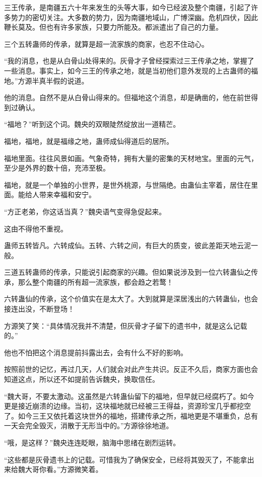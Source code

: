 \begin{this_body}
三王传承，是南疆五六十年来发生的头等大事，如今已经波及整个南疆，引起了许多势力的密切关注。大多数的势力，因为南疆地域山，广博深幽。危机四伏，因此鞭长莫及。但也有许多家族，只要力所能及。都派遣出了自己的力量。

三个五转蛊师的传承，就算是超一流家族的商家，也忍不住动心。

“我的消息，也是从白骨山处得来的。灰骨才子曾经探索过三王传承之地，掌握了一些消息。事实上，如今三王的传承之地，就是当初他们意外发现的上古蛊师的福地。”方源半真半假的说道。

他的消息。自然不是从白骨山得来的。但福地这个消息，却是确凿的，他在前世得到过确认。

“福地？”听到这个词。魏央的双眼陡然绽放出一道精芒。

福地，福地，就是福缘之地，蛊师成仙得道后的居所。

福地里面。往往风景如画。气象奇特，拥有大量的密集的天材地宝。里面的元气，至少是外界的数十倍，充沛至极。

福地，就是一个单独的小世界，是世外桃源，与世隔绝。由蛊仙主宰着，居住在里面。能给人带来幸福和安宁。

“方正老弟，你这话当真？”魏央语气变得急促起来。

这由不得他不重视。

蛊师五转皆凡。六转成仙。五转、六转之间，有巨大的质变，彼此差距天地云泥一般。

三道五转蛊师的传承，只能说引起商家的兴趣。但如果说涉及到一位六转蛊仙之传承，那么整个南疆的所有超一流家族，都会趋之若鹜！

六转蛊仙的传承，这个价值实在是太大了。大到就算是深居浅出的六转蛊仙，也会接连出没，不断登场！

方源笑了笑：“具体情况我并不清楚，但灰骨才子留下的遗书中，就是这么记载的。”

他也不怕把这个消息提前抖露出去，会有什么不好的影响。

按照前世的记忆，再过几天，人们就会对此产生共识。反正不久后，商家方面也会知道这点，所以还不如提前告诉魏央，换取信任。

“魏大哥，不要太激动。这虽然是六转蛊仙留下的福地，但早就已经腐朽了。如今更是接近崩溃的边缘。当初，这块福地就已经被三王得益，资源珍宝几乎都挖空了。如今三王又依托着这块世外的福地，搭建传承之所，福地更是不堪重负，总有一天会完全毁灭，消散于无形当中的。”方源徐徐地道。

“哦，是这样？”魏央连连眨眼，脑海中思绪在剧烈运转。

“这些都是灰骨遗书上的记载。可惜我为了确保安全，已经将其毁灭了，不能拿出来给魏大哥你看。”方源微笑着。


\end{this_body}
